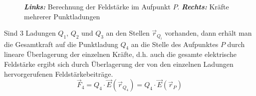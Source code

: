 \begin{figure}[H]
\quad
{}
\centering
\caption{\textbf{\textit{Links:}} Berechnung der Feldstärke im Aufpunkt $P$. \textbf{\textit{Rechts:}} Kräfte mehrerer Punktladungen}
\label{fig_Ih}
\end{figure}
\noindent Sind $3$ Ladungen $Q_1$, $Q_2$ und $Q_3$ an den Stellen $\overrightarrow{r}_{Q_i}$ vorhanden, dann erhält man die Gesamtkraft auf die Punktladung $Q_4$ an die Stelle des Aufpunktes $P$ durch lineare Überlagerung der einzelnen Kräfte, d.h. auch die gesamte elektrische Feldstärke ergibt sich durch Überlagerung der von den einzelnen Ladungen hervorgerufenen Feldstärkebeiträge.
\begin{equation}
\boxed{\overrightarrow{F}_4=Q_4\cdot \overrightarrow{E}\left(\overrightarrow{r}_{Q_4}\right)=Q_4\cdot \overrightarrow{E}\left(\overrightarrow{r}_P\right)}
\end{equation}
